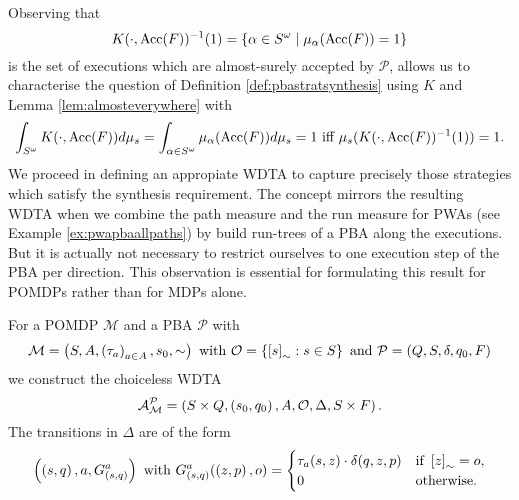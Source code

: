 Observing that
\begin{equation*}
  K(\cdot,\operatorname{Acc}(F))^{-1}(1) = \left\{
    \alpha\in S^{\omega}\mid\mu_{\alpha}(\operatorname{Acc}(F)) = 1
  \right\}
\end{equation*}
is the set of executions which are almost-surely accepted by $\mathcal{P}$,
allows us to characterise the question of Definition
\ref{def:pbastratsynthesis} using $K$ and Lemma \ref{lem:almosteverywhere} with
\begin{equation*}
  \int_{S^{\omega}}K(\cdot, \operatorname{Acc}(F)) d\mu_{s} 
  = \int_{\alpha\in S^{\omega}}\mu_{\alpha}(\operatorname{Acc}(F))d\mu_{s} = 1 \text{ iff }
    \mu_{s}(K(\cdot,\operatorname{Acc}(F))^{-1}(1)) = 1.
\end{equation*}
We proceed in defining an appropiate \ac{WDTA} to capture precisely those
strategies which satisfy the synthesis requirement. The concept mirrors the
resulting \ac{WDTA} when we combine the path measure and the run measure for
\acp{PWA} (see Example \ref{ex:pwapbaallpaths}) by build run-trees of a
\ac{PBA} along the executions. But it is actually not necessary to restrict
ourselves to one execution step of the \ac{PBA} per direction. This
observation is essential for formulating this result for \acp{POMDP} rather
than for \acp{MDP} alone.
\begin{definition}
  For a \ac{POMDP} $\mathcal{M}$ and a \ac{PBA} $\mathcal{P}$ with
  \begin{equation*}
    \mathcal{M} = \left(S, A, \left(\tau_{a}\right)_{a\in A}, s_{0}, \sim\right)
    \text{ with }
    \mathcal{O} = \left\{\left[s\right]_{\sim}: s\in S\right\}
    \text{ and }
    \mathcal{P} = \left(Q, S, \delta, q_{0}, F\right)
  \end{equation*} 
  we construct the choiceless \ac{WDTA}
  \begin{equation*}
    \mathcal{A}_{\mathcal{M}}^{\mathcal{P}} = \left(
      S\times Q, \left(s_{0}, q_{0}\right), A, \mathcal{O}, \Delta, S\times F
    \right).
  \end{equation*}
  The transitions in $\Delta$ are of the form
  \begin{equation*}
    \left(\left(s, q\right), a, G_{\left(s,q\right)}^{a}\right)
    \text{ with }
    G_{\left(s,q\right)}^{a}(\left(z,p\right), o) = \begin{cases}
      \tau_{a}(s, z)\cdot\delta(q, z, p)&\text{if }\left[z\right]_{\sim} = o,\\
      0&\text{otherwise}.
    \end{cases}
  \end{equation*}
\end{definition}
